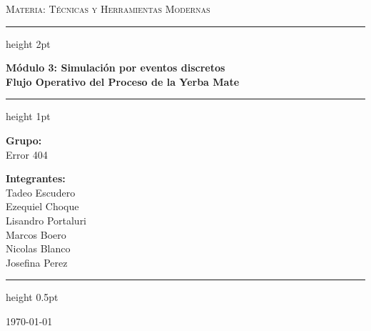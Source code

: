 \documentclass[11pt, a4paper]{article}
\begin{document}
\begin{titlepage}
    \centering
    \vspace*{1cm}
    
    {\large\scshape\color{secondary} Materia: Técnicas y Herramientas Modernas} \\[0.4cm]

    \vspace{1.5cm}
    
    {\color{primary}\hrule height 2pt}
    \vspace{0.6cm}
    
    {\Huge \bfseries \color{primary} Módulo 3: Simulación por eventos discretos} \\[0.4cm]
    {\Large \bfseries \color{secondary} Flujo Operativo del Proceso de la Yerba Mate} \\
    \vspace{0.6cm}
    
    {\color{primary}\hrule height 1pt}
    \vspace{2.5cm}
    
    \begin{minipage}{0.45\textwidth}
        \begin{flushleft} \large
            \textbf{\color{primary}Grupo:} \\
            {\selectfont Error 404} \\[1cm] %
        \end{flushleft}
    \end{minipage}
    \begin{minipage}{0.45\textwidth}
        \begin{flushright} \large
            \textbf{\color{primary}Integrantes:} \\
            \vspace{0.1cm}
            Tadeo Escudero \\
            Ezequiel Choque \\
            Lisandro Portaluri \\
            Marcos Boero \\
            Nicolas Blanco \\
            Josefina Perez \\
        \end{flushright}
    \end{minipage}
    
    \vfill
    
    {\color{secondary}\hrule height 0.5pt}
    \vspace{0.4cm}
    {\large\color{secondary} \today}
    \vspace*{0.5cm}
\end{titlepage}
\end{document}
